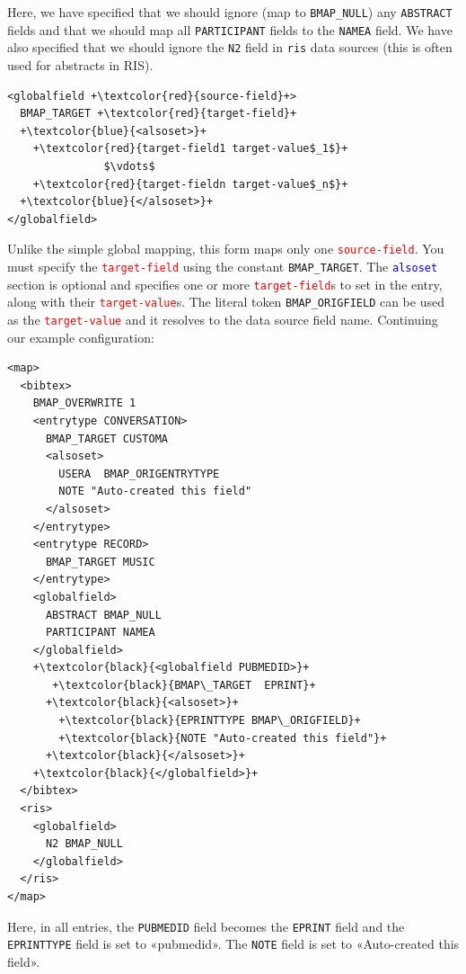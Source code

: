 \documentclass{ltxdockit}
\begin{document}
\noindent Here, we have specified that we should ignore (map to
\verb+BMAP_NULL+) any \verb+ABSTRACT+ fields and that we should map all
\verb+PARTICIPANT+ fields to the \verb+NAMEA+ field. We have also specified
that we should ignore the \verb+N2+ field in \verb+ris+ data sources (this
is often used for abstracts in RIS).
\bigskip
{}

\lstset{showspaces=false}
\begin{lstlisting}[escapechar=+,mathescape=true]
<globalfield +\textcolor{red}{source-field}+>
  BMAP_TARGET +\textcolor{red}{target-field}+
  +\textcolor{blue}{<alsoset>}+
    +\textcolor{red}{target-field1 target-value$_1$}+
               $\vdots$
    +\textcolor{red}{target-fieldn target-value$_n$}+
  +\textcolor{blue}{</alsoset>}+
</globalfield>
\end{lstlisting}

\noindent Unlike the simple global mapping, this form maps only one
\textcolor{red}{\texttt{source-field}}. You must specify the
\textcolor{red}{\texttt{target-field}} using the constant
\verb+BMAP_TARGET+. The \textcolor{blue}{\texttt{alsoset}} section is
optional and specifies one or more \textcolor{red}{\texttt{target-field}}s
to set in the entry, along with their
\textcolor{red}{\texttt{target-value}}s. The literal token
\verb+BMAP_ORIGFIELD+ can be used as the
\textcolor{red}{\texttt{target-value}} and it resolves to the data source
field name. Continuing our example configuration:

{\color{grey}
\lstset{showspaces=false}
\begin{lstlisting}[escapechar=+,mathescape=true]
<map>
  <bibtex>
    BMAP_OVERWRITE 1
    <entrytype CONVERSATION>
      BMAP_TARGET CUSTOMA
      <alsoset>
        USERA  BMAP_ORIGENTRYTYPE
        NOTE "Auto-created this field"
      </alsoset>
    </entrytype>
    <entrytype RECORD>
      BMAP_TARGET MUSIC
    </entrytype>
    <globalfield>
      ABSTRACT BMAP_NULL
      PARTICIPANT NAMEA
    </globalfield>
    +\textcolor{black}{<globalfield PUBMEDID>}+
       +\textcolor{black}{BMAP\_TARGET  EPRINT}+
      +\textcolor{black}{<alsoset>}+
        +\textcolor{black}{EPRINTTYPE BMAP\_ORIGFIELD}+
        +\textcolor{black}{NOTE "Auto-created this field"}+
      +\textcolor{black}{</alsoset>}+
    +\textcolor{black}{</globalfield>}+
  </bibtex>
  <ris>
    <globalfield>
      N2 BMAP_NULL
    </globalfield>
  </ris>
</map>
\end{lstlisting}
}

\noindent Here, in all entries, the \verb+PUBMEDID+ field becomes the
\verb+EPRINT+ field and the \verb+EPRINTTYPE+ field is set to «pubmedid».
The \verb+NOTE+ field is set to «Auto-created this field».
\bigskip
{}
\end{document}

